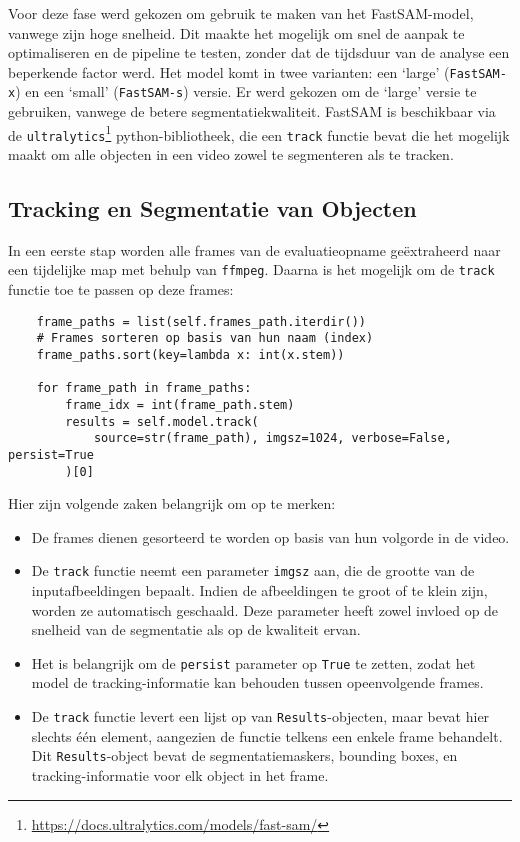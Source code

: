 Voor deze fase werd gekozen om gebruik te maken van het FastSAM-model, vanwege zijn hoge snelheid.
Dit maakte het mogelijk om snel de aanpak te optimaliseren en de pipeline te testen, zonder dat de tijdsduur van de analyse een beperkende factor werd.
Het model komt in twee varianten: een `large' (\texttt{FastSAM-x}) en een `small' (\texttt{FastSAM-s}) versie.
Er werd gekozen om de `large' versie te gebruiken, vanwege de betere segmentatiekwaliteit.
FastSAM is beschikbaar via de \texttt{ultralytics}\footnote{\url{https://docs.ultralytics.com/models/fast-sam/}} python-bibliotheek,
die een \texttt{track} functie bevat die het mogelijk maakt om alle objecten in een video zowel te segmenteren als te tracken.

\subsection{Tracking en Segmentatie van Objecten}

In een eerste stap worden alle frames van de evaluatieopname geëxtraheerd naar een tijdelijke map met behulp van \texttt{ffmpeg}.
Daarna is het mogelijk om de \texttt{track} functie toe te passen op deze frames:

\begin{listing}[H]
  \begin{verbatim}
    frame_paths = list(self.frames_path.iterdir())
    # Frames sorteren op basis van hun naam (index)
    frame_paths.sort(key=lambda x: int(x.stem))

    for frame_path in frame_paths:
        frame_idx = int(frame_path.stem)
        results = self.model.track(
            source=str(frame_path), imgsz=1024, verbose=False, persist=True
        )[0]
    \end{verbatim}
  \caption[Tracking van objecten met FastSAM]{}
\end{listing}

Hier zijn volgende zaken belangrijk om op te merken:
\begin{itemize}
    \item De frames dienen gesorteerd te worden op basis van hun volgorde in de video.
    \item De \texttt{track} functie neemt een parameter \texttt{imgsz} aan, die de grootte van de inputafbeeldingen bepaalt.
    Indien de afbeeldingen te groot of te klein zijn, worden ze automatisch geschaald.
    Deze parameter heeft zowel invloed op de snelheid van de segmentatie als op de kwaliteit ervan.
    \item Het is belangrijk om de \texttt{persist} parameter op \texttt{True} te zetten, 
    zodat het model de tracking-informatie kan behouden tussen opeenvolgende frames.
    \item De \texttt{track} functie levert een lijst op van \texttt{Results}-objecten, maar bevat hier slechts één element, aangezien de functie telkens een enkele frame behandelt.
    Dit \texttt{Results}-object bevat de segmentatiemaskers, bounding boxes, en tracking-informatie voor elk object in het frame.
\end{itemize}

